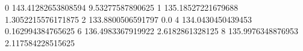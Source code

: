 0 143.41282653808594 9.53277587890625
1 135.18527221679688 1.3052215576171875
2 133.8800506591797 0.0
4 134.0430450439453 0.162994384765625
6 136.4983367919922 2.6182861328125
8 135.9976348876953 2.117584228515625
